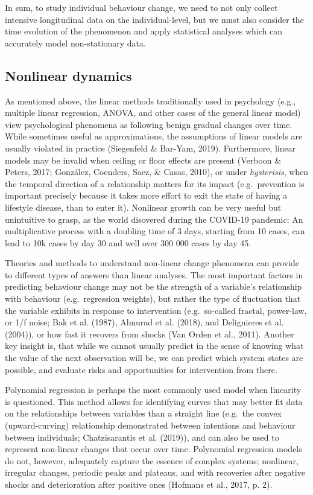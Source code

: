 \documentclass[
  british,
  man,floatsintext]{apa6}
\begin{document}
In sum, to study individual behaviour change, we need to not only collect intensive longitudinal data on the individual-level, but we must also consider the time evolution of the phenomenon and apply statistical analyses which can accurately model non-stationary data.

\hypertarget{nonlinear-dynamics}{%
\subsection{Nonlinear dynamics}\label{nonlinear-dynamics}}

As mentioned above, the linear methods traditionally used in psychology (e.g., multiple linear regression, ANOVA, and other cases of the general linear model) view psychological phenomena as following benign gradual changes over time. While sometimes useful as approximations, the assumptions of linear models are usually violated in practice (Siegenfeld \& Bar-Yam, 2019). Furthermore, linear models may be invalid when ceiling or floor effects are present (Verboon \& Peters, 2017; González, Coenders, Saez, \& Casas, 2010), or under \emph{hysterisis}, when the temporal direction of a relationship matters for its impact (e.g.~prevention is important precisely because it takes more effort to exit the state of having a lifestyle disease, than to enter it). Nonlinear growth can be very useful but unintuitive to grasp, as the world disovered during the COVID-19 pandemic: An multiplicative process with a doubling time of 3 days, starting from 10 cases, can lead to 10k cases by day 30 and well over 300 000 cases by day 45.

Theories and methods to understand non-linear change phenomena can provide to different types of answers than linear analyses. The most important factors in predicting behaviour change may not be the strength of a variable's relationship with behaviour (e.g.~regression weights), but rather the type of fluctuation that the variable exhibits in response to intervention (e.g.~so-called fractal, power-law, or 1/f noise; Bak et al. (1987), Almurad et al. (2018), and Delignieres et al. (2004)), or how fast it recovers from shocks (Van Orden et al., 2011). Another key insight is, that while we cannot usually predict in the sense of knowing what the value of the next observation will be, we can predict which system states are possible, and evaluate risks and opportunities for intervention from there.

Polynomial regression is perhaps the most commonly used model when linearity is questioned. This method allows for identifying curves that may better fit data on the relationships between variables than a straight line (e.g.~the convex (upward-curving) relationship demonstrated between intentions and behaviour between individuals; Chatzisarantis et al. (2019)), and can also be used to represent non-linear changes that occur over time. Polynomial regression models do not, however, adequately capture the essence of complex systems; nonlinear, irregular changes, periodic peaks and plateaus, and with recoveries after negative shocks and deterioration after positive ones (Hofmans et al., 2017, p. 2).
\end{document}
